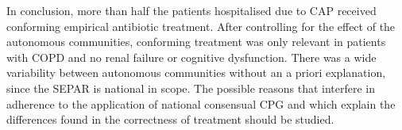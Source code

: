 \documentclass[11pt, a4paper]{article}
\begin{document}
\begin{multicols}{2}
In conclusion, more than half the patients hospitalised due to CAP received conforming empirical antibiotic treatment. After controlling for the effect of the autonomous communities, conforming treatment was only relevant in patients with COPD and no renal failure or cognitive dysfunction. There was a wide variability between autonomous communities without an a priori explanation, since the SEPAR is national in scope. The possible reasons that interfere in adherence to the application of national consensual CPG and which explain the differences found in the correctness of treatment should be studied.

\end{multicols}




\end{document}
